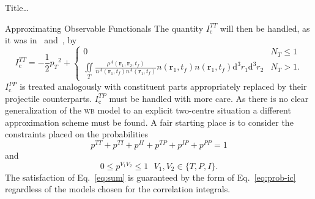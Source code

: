 \documentclass[letterpaper, 11 pt]{report}
\begin{document}
\begin{chapter}{ Title\dots \label{chap:p-he2p-he}}
\begin{section}{Approximating Observable Functionals \label{sec:phe2p-obs}}
      The quantity $I_\mathrm{c}^{TT}$ will then be handled, as it was in~\cite{thesis}
      and~\cite{pbarhe}, by
      \begin{equation} \label{eq:wbExplicit}
         I_\mathrm{c}^{TT} = - \frac{1}{2} {p_T}^2 +
         \begin{cases}
            0 & N_T \leq 1 \\
            \iint\limits_T \frac{\rho^A(\mathbf{r}_1, \mathbf{r}_2,t_f)}
                    {n^{A}(\mathbf{r}_1,t_f) n^{A}(\mathbf{r}_1,t_f)}
                    n(\mathbf{r}_1,t_f) n(\mathbf{r}_1,t_f) \mathrm{d}^3 r_1 \mathrm{d}^3 r_2
            & N_T > 1.
         \end{cases}
      \end{equation}
      $I_\mathrm{c}^{PP}$ is treated analogously with constituent parts appropriately replaced by their
      projectile counterparts. $I_\mathrm{c}^{TP}$ must be handled with more care. As there is no clear
      generalization of the \textsc{wb} model to an explicit two-centre situation a different
      approximation scheme must be found. A fair starting place is to consider the constraints placed on
      the probabilities
      \begin{equation} \label{eq:sum}
         p^{TT} + p^{TI} + p^{II} + p^{TP} + p^{IP} + p^{PP} = 1
      \end{equation}
      and
      \begin{equation} \label{eq:bound}
         0 \leq p^{V_1 V_2} \leq 1 ~ ~ ~ V_1, V_2 \in\{ T,P,I\}.
      \end{equation}
      The satisfaction of Eq.~\eqref{eq:sum} is guaranteed by the form of Eq.~\eqref{eq:prob-ic}
      regardless of the models chosen for the correlation integrals.


\end{section}
\end{chapter}
\end{document}

